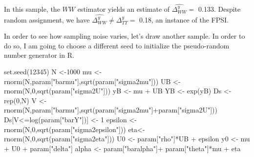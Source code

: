 \documentclass[
]{book}
\newenvironment{Shaded}{\begin{snugshade}}{\end{snugshade}}
\newcommand{\DecValTok}[1]{\textcolor[rgb]{0.00,0.00,0.81}{#1}}
\newcommand{\FunctionTok}[1]{\textcolor[rgb]{0.00,0.00,0.00}{#1}}
\newcommand{\NormalTok}[1]{#1}
\newcommand{\OtherTok}[1]{\textcolor[rgb]{0.56,0.35,0.01}{#1}}
\newcommand{\SpecialCharTok}[1]{\textcolor[rgb]{0.00,0.00,0.00}{#1}}
\newcommand{\StringTok}[1]{\textcolor[rgb]{0.31,0.60,0.02}{#1}}
\theoremstyle{definition}
\theoremstyle{definition}
\theoremstyle{definition}
\theoremstyle{definition}
\theoremstyle{remark}
\begin{document}
In this sample, the \(WW\) estimator yields an estimate of \(\hat{\Delta^y_{WW}}=\) 0.133.
Despite random assignment, we have \(\hat{\Delta^y_{WW}}\neq\Delta^y_{TT}=\) 0.18, an instance of the FPSI.

In order to see how sampling noise varies, let's draw another sample.
In order to do so, I am going to choose a different seed to initialize the pseudo-random number generator in R.

\begin{Shaded}
\begin{Highlighting}[]
\FunctionTok{set.seed}\NormalTok{(}\DecValTok{12345}\NormalTok{)}
\NormalTok{N }\OtherTok{\textless{}{-}}\DecValTok{1000}
\NormalTok{mu }\OtherTok{\textless{}{-}} \FunctionTok{rnorm}\NormalTok{(N,param[}\StringTok{"barmu"}\NormalTok{],}\FunctionTok{sqrt}\NormalTok{(param[}\StringTok{"sigma2mu"}\NormalTok{]))}
\NormalTok{UB }\OtherTok{\textless{}{-}} \FunctionTok{rnorm}\NormalTok{(N,}\DecValTok{0}\NormalTok{,}\FunctionTok{sqrt}\NormalTok{(param[}\StringTok{"sigma2U"}\NormalTok{]))}
\NormalTok{yB }\OtherTok{\textless{}{-}}\NormalTok{ mu }\SpecialCharTok{+}\NormalTok{ UB }
\NormalTok{YB }\OtherTok{\textless{}{-}} \FunctionTok{exp}\NormalTok{(yB)}
\NormalTok{Ds }\OtherTok{\textless{}{-}} \FunctionTok{rep}\NormalTok{(}\DecValTok{0}\NormalTok{,N)}
\NormalTok{V }\OtherTok{\textless{}{-}} \FunctionTok{rnorm}\NormalTok{(N,param[}\StringTok{"barmu"}\NormalTok{],}\FunctionTok{sqrt}\NormalTok{(param[}\StringTok{"sigma2mu"}\NormalTok{]}\SpecialCharTok{+}\NormalTok{param[}\StringTok{"sigma2U"}\NormalTok{]))}
\NormalTok{Ds[V}\SpecialCharTok{\textless{}=}\FunctionTok{log}\NormalTok{(param[}\StringTok{"barY"}\NormalTok{])] }\OtherTok{\textless{}{-}} \DecValTok{1} 
\NormalTok{epsilon }\OtherTok{\textless{}{-}} \FunctionTok{rnorm}\NormalTok{(N,}\DecValTok{0}\NormalTok{,}\FunctionTok{sqrt}\NormalTok{(param[}\StringTok{"sigma2epsilon"}\NormalTok{]))}
\NormalTok{eta}\OtherTok{\textless{}{-}} \FunctionTok{rnorm}\NormalTok{(N,}\DecValTok{0}\NormalTok{,}\FunctionTok{sqrt}\NormalTok{(param[}\StringTok{"sigma2eta"}\NormalTok{]))}
\NormalTok{U0 }\OtherTok{\textless{}{-}}\NormalTok{ param[}\StringTok{"rho"}\NormalTok{]}\SpecialCharTok{*}\NormalTok{UB }\SpecialCharTok{+}\NormalTok{ epsilon}
\NormalTok{y0 }\OtherTok{\textless{}{-}}\NormalTok{ mu }\SpecialCharTok{+}\NormalTok{  U0 }\SpecialCharTok{+}\NormalTok{ param[}\StringTok{"delta"}\NormalTok{]}
\NormalTok{alpha }\OtherTok{\textless{}{-}}\NormalTok{ param[}\StringTok{"baralpha"}\NormalTok{]}\SpecialCharTok{+}\NormalTok{  param[}\StringTok{"theta"}\NormalTok{]}\SpecialCharTok{*}\NormalTok{mu }\SpecialCharTok{+}\NormalTok{ eta}

\end{Highlighting}
\end{Shaded}
\end{document}
